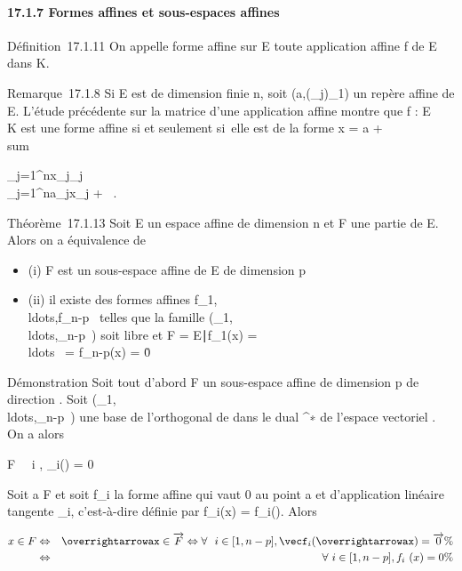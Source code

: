 \documentclass[]{article}
\begin{document}
\paragraph{17.1.7 Formes affines et sous-espaces affines}

Définition~17.1.11 On appelle forme affine sur E toute application
affine f de E dans K.

Remarque~17.1.8 Si E est de dimension finie n, soit
(a,(\vece_j)_1\leqj\leqn) un repère
affine de E. L'étude précédente sur la matrice d'une application affine
montre que f : E \rightarrow~ K est une forme affine si et seulement si~elle est de
la forme x = a +\ \\sum

_j=1^nx_j\vece_j\mapsto~\\\sum
 _j=1^na_jx_j + \alpha~.

Théorème~17.1.13 Soit E un espace affine de dimension n et F une partie
de E. Alors on a équivalence de

\begin{itemize}
\itemsep1pt\parskip0pt
\item
  (i) F est un sous-espace affine de E de dimension p
\item
  (ii) il existe des formes affines
  f_1,\\ldots,f_n-p~
  telles que la famille
  (\vecf_1,\\ldots,\vecf_n-p~)
  soit libre et F = \x \in
  E∣f_1(x) =
  \\ldots~ =
  f_n-p(x) = 0\.
\end{itemize}

Démonstration Soit tout d'abord F un sous-espace affine de dimension p
de direction \overrightarrowF. Soit
(\vecf_1,\\ldots,\vecf_n-p~)
une base de l'orthogonal de \overrightarrowF dans le
dual \overrightarrowE^∗ de l'espace
vectoriel \overrightarrowE. On a alors

\overrightarrow\xi \in\overrightarrow
F \Leftrightarrow \forall~~i \in [1,n -
p],
\vecf_i(\overrightarrow\xi)
= 0

Soit a \in F et soit f_i la forme affine qui vaut 0 au point a et
d'application linéaire tangente \vecf_i,
c'est-à-dire définie par f_i(x) =\vec
f_i(\overrightarrowax). Alors

\begin{align*} x \in F& \Leftrightarrow
& \overrightarrowax
\in\overrightarrow F \Leftrightarrow
\forall~~i \in [1,n - p],
\vecf_i(\overrightarrowax)
=\overrightarrow 0\%&
\\ & \Leftrightarrow &
\forall~i \in [1,n - p], f_i~(x) = 0 \%&
\\ \end{align*}
\end{document}
